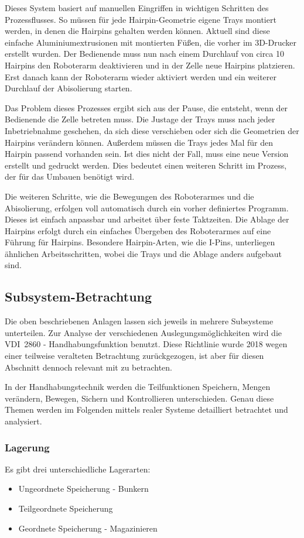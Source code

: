 Dieses System basiert auf manuellen Eingriffen in wichtigen Schritten des Prozessflusses. So müssen für
jede Hairpin-Geometrie eigene Trays montiert werden, in denen die Hairpins gehalten werden können. Aktuell sind
diese einfache Aluminiumextrusionen mit montierten Füßen, die vorher im 3D-Drucker erstellt wurden. Der Bedienende
muss nun nach einem Durchlauf von circa 10 Hairpins den Roboterarm deaktivieren und in der Zelle neue Hairpins
platzieren. Erst danach kann der Roboterarm wieder aktiviert werden und ein weiterer Durchlauf der Abisolierung
starten.

Das Problem dieses Prozesses ergibt sich aus der Pause, die entsteht, wenn der Bedienende die Zelle
betreten muss. Die Justage der Trays muss nach jeder Inbetriebnahme geschehen, da sich diese verschieben
oder sich die Geometrien der Hairpins verändern  können. Außerdem müssen die Trays jedes Mal für den Hairpin passend vorhanden
sein. Ist dies nicht der Fall, muss eine neue Version erstellt und gedruckt werden. Dies bedeutet einen
weiteren Schritt im Prozess, der für das Umbauen benötigt wird.

Die weiteren Schritte, wie die Bewegungen des Roboterarmes und die Abisolierung, erfolgen voll automatisch
durch ein vorher definiertes Programm. Dieses ist einfach anpassbar und arbeitet über feste Taktzeiten.
Die Ablage der Hairpins erfolgt durch ein einfaches Übergeben des Roboterarmes auf eine Führung für Hairpins.
Besondere Hairpin-Arten, wie die I-Pins, unterliegen ähnlichen Arbeitsschritten, wobei die Trays und die Ablage
anders aufgebaut sind.
%
%
\subsection{Subsystem-Betrachtung}\label{sec:SubSystem}
Die oben beschriebenen Anlagen lassen sich jeweils in mehrere Subsysteme unterteilen. Zur Analyse
der verschiedenen Auslegungsmöglichkeiten wird die VDI~2860 - Handhabungsfunktion benutzt. Diese
Richtlinie wurde 2018 wegen einer teilweise veralteten Betrachtung zurückgezogen, ist aber für diesen
Abschnitt dennoch relevant mit zu betrachten.

In der Handhabungstechnik werden die Teilfunktionen Speichern, Mengen verändern, Bewegen, Sichern
und Kontrollieren unterschieden. Genau diese Themen werden im Folgenden mittels realer Systeme detailliert betrachtet und analysiert.
%
\subsubsection{Lagerung}\label{sec:LagerungsSystem}
Es gibt drei unterschiedliche Lagerarten:
\begin{itemize}
  \item Ungeordnete Speicherung - Bunkern
  \item Teilgeordnete Speicherung
  \item Geordnete Speicherung - Magazinieren
\end{itemize}


